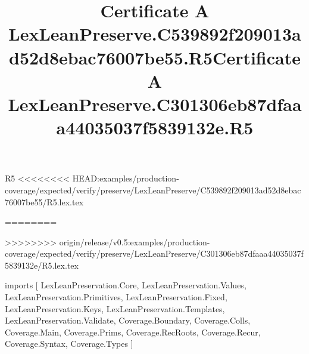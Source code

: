\begin{lexlean}{R5}
<<<<<<<< HEAD:examples/production-coverage/expected/verify/preserve/LexLeanPreserve/C539892f209013ad52d8ebac76007be55/R5.lex.tex
\title{Certificate A LexLeanPreserve.C539892f209013ad52d8ebac76007be55.R5}
========
\title{Certificate A LexLeanPreserve.C301306eb87dfaaa44035037f5839132e.R5}
>>>>>>>> origin/release/v0.5:examples/production-coverage/expected/verify/preserve/LexLeanPreserve/C301306eb87dfaaa44035037f5839132e/R5.lex.tex
\begin{coremodule}
imports [
  LexLeanPreservation.Core,
  LexLeanPreservation.Values,
  LexLeanPreservation.Primitives,
  LexLeanPreservation.Fixed,
  LexLeanPreservation.Keys,
  LexLeanPreservation.Templates,
  LexLeanPreservation.Validate,
  Coverage.Boundary,
  Coverage.Colls,
  Coverage.Main,
  Coverage.Prims,
  Coverage.RecRoots,
  Coverage.Recur,
  Coverage.Syntax,
  Coverage.Types
]


\end{coremodule}
\end{lexlean}
